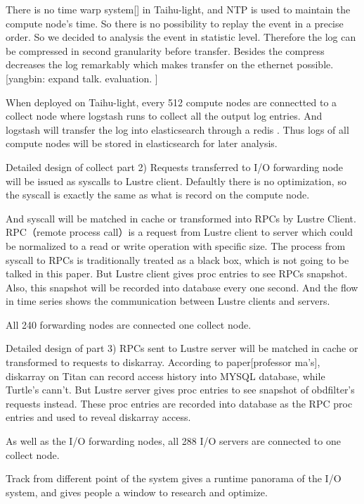 \documentclass{article}
\begin{document}
There is no time warp system[] in Taihu-light, and NTP is used to maintain the compute node's time. So there is no possibility to replay the event in a precise order. So we decided to analysis the event in statistic level. Therefore the log can be compressed in second granularity before transfer. Besides the compress decreases the log remarkably which makes transfer on the ethernet possible.[yangbin: expand talk. evaluation. ]

When deployed on Taihu-light, every 512 compute nodes are connectted to a collect node where logstash runs to collect all the output log entries. And logstash will transfer the log into elasticsearch through a redis . Thus logs of all compute nodes will be stored in elasticsearch for later analysis.

Detailed design of collect part 2)
Requests transferred to I/O forwarding node will be issued as syscalls to Lustre client. Defaultly there is no optimization, so the syscall is exactly the same as 
what is record on the compute node.

And syscall will be matched in cache or transformed into RPCs by Lustre Client. RPC（remote process call）is a request from Lustre client to server which could be normalized to a read or write operation with specific size. The process from syscall to RPCs is traditionally treated as a black box, which is not going to be talked in this paper. But Lustre client gives proc entries to see RPCs snapshot. Also, this snapshot will be recorded into database every one second. And the flow in time series shows the communication between Lustre clients and servers.

All 240 forwarding nodes are connected one collect node.

Detailed design of part 3)
RPCs sent to Lustre server will be matched in cache or  transformed to requests to diskarray. According to paper[professor ma's], diskarray on Titan can record access history into MYSQL database, while Turtle's cann't. But Lustre server gives proc entries to see snapshot of obdfilter's requests instead. These proc entries are recorded into database as the RPC proc entries and used to reveal diskarray access.

As well as the I/O forwarding nodes, all 288 I/O servers are connected to one collect node.

Track from different point of the system gives a runtime panorama of the I/O system, and gives people a window to research and optimize. 
\end{document}
